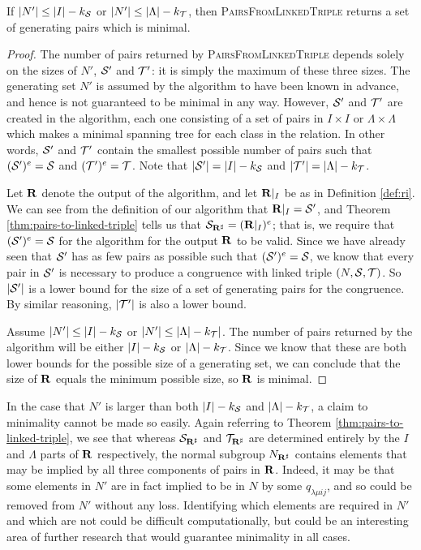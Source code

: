 \begin{theorem}
  If $|N'| \leq |I| - k_{\mathcal{S}}$ or $|N'| \leq |\Lambda| - k_{\mathcal{T}}$, then
  \textsc{PairsFromLinkedTriple} returns a set of generating pairs
  which is minimal.
  \begin{proof}
    The number of pairs returned by \textsc{PairsFromLinkedTriple}
    depends solely on the sizes of $N'$, $\mathcal{S}'$ and $\mathcal{T}'$: it is simply the
    maximum of these three sizes.  The generating set $N'$ is assumed by the
    algorithm to have been known in advance, and hence is not guaranteed to be
    minimal in any way.  However, $\mathcal{S}'$ and $\mathcal{T}'$ are created in the
    algorithm, each one consisting of a set of pairs in $I \times I$ or
    $\Lambda \times \Lambda$ which makes a minimal spanning tree for each class
    in the relation.  In other words, $\mathcal{S}'$ and $\mathcal{T}'$ contain the smallest
    possible number of pairs such that $(\mathcal{S}')^e = \mathcal{S}$ and $(\mathcal{T}')^e = \mathcal{T}$.
    Note that $|\mathcal{S}'| = |I| - k_{\mathcal{S}}$ and $|\mathcal{T}'| = |\Lambda| - k_{\mathcal{T}}$.

    Let $\mathbf{R}$ denote the output of the algorithm, and let $\mathbf{R}|_I$ be as in
    Definition \ref{def:ri}.  We can see from the definition of our algorithm
    that $\mathbf{R}|_I = \mathcal{S}'$, and Theorem \ref{thm:pairs-to-linked-triple} tells us
    that $\mathcal{S}_{\mathbf{R}^\sharp} = (\mathbf{R}|_I)^e$; that is, we require that $(\mathcal{S}')^e = \mathcal{S}$ for
    the algorithm for the output $\mathbf{R}$ to be valid.  Since we have already seen
    that $\mathcal{S}'$ has as few pairs as possible such that $(\mathcal{S}')^e = \mathcal{S}$, we know
    that every pair in $\mathcal{S}'$ is necessary to produce a congruence with linked
    triple $(N, \mathcal{S}, \mathcal{T})$.  So $|\mathcal{S}'|$ is a lower bound for the
    size of a set of generating pairs for the congruence.  By similar reasoning,
    $|\mathcal{T}'|$ is also a lower bound.

    Assume $|N'| \leq |I| - k_{\mathcal{S}}$ or $|N'| \leq |\Lambda| - k_{\mathcal{T}}|$.  The
    number of pairs returned by the algorithm will be either $|I| - k_{\mathcal{S}}$ or
    $|\Lambda| - k_{\mathcal{T}}$.  Since we know that these are both lower bounds for the
    possible size of a generating set, we can conclude that the size of $\mathbf{R}$
    equals the minimum possible size, so $\mathbf{R}$ is minimal.
  \end{proof}
\end{theorem}

In the case that $N'$ is larger than both $|I| - k_{\mathcal{S}}$ and $|\Lambda| - k_{\mathcal{T}}$,
a claim to minimality cannot be made so easily.  Again referring to Theorem
\ref{thm:pairs-to-linked-triple}, we see that whereas $\mathcal{S}_{\mathbf{R}^\sharp}$ and
$\mathcal{T}_{\mathbf{R}^\sharp}$ are determined entirely by the $I$ and $\Lambda$ parts of $\mathbf{R}$
respectively, the normal subgroup $N_{\mathbf{R}^\sharp}$ contains elements that may be
implied by all three components of pairs in $\mathbf{R}$.  Indeed, it may be that some
elements in $N'$ are in fact implied to be in $N$ by some $q_{\lambda \mu i j}$,
and so could be removed from $N'$ without any loss.  Identifying which elements
are required in $N'$ and which are not could be difficult computationally, but
could be an interesting area of further research that would guarantee minimality
in all cases.

